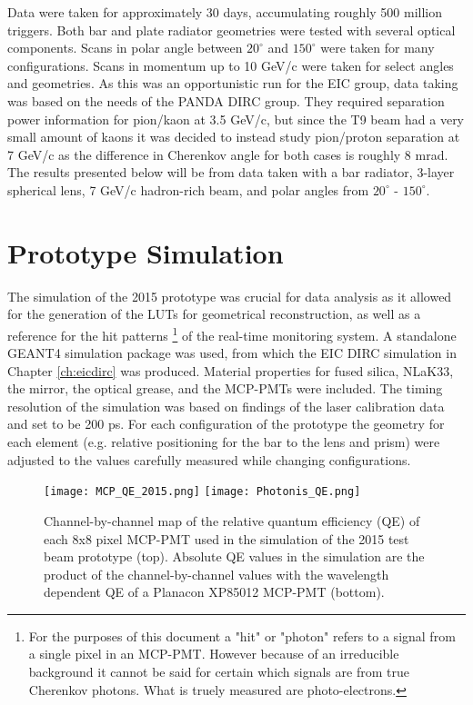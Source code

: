 Data were taken for approximately 30 days, accumulating roughly 500 million triggers. Both bar and plate radiator geometries were tested with several optical components. Scans in polar angle between $20^\circ$ and $150^\circ$ were taken for many configurations. Scans in momentum up to 10 GeV/c were taken for select angles and geometries. As this was an opportunistic run for the EIC group, data taking was based on the needs of the PANDA DIRC group. They required separation power information for pion/kaon at 3.5 GeV/c, but since the T9 beam had a very small amount of kaons it was decided to instead study pion/proton separation at 7 GeV/c as the difference in Cherenkov angle for both cases is roughly 8 mrad. The results presented below will be from data taken with a bar radiator, 3-layer spherical lens, 7 GeV/c hadron-rich beam, and polar angles from  $20^\circ$ - $150^\circ$.

\section{Prototype Simulation}
The simulation of the 2015 prototype was crucial for data analysis as it allowed for the generation of the LUTs for geometrical reconstruction, as well as a reference for the hit patterns \footnote{For the purposes of this document a "hit" or "photon" refers to a signal from a single pixel in an MCP-PMT. However because of an irreducible background it cannot be said for certain which signals are from true Cherenkov photons. What is truely measured are photo-electrons.} of the real-time monitoring system. A standalone GEANT4 simulation package was used, from which the EIC DIRC simulation in Chapter \ref{ch:eicdirc} was produced. Material properties for fused silica, NLaK33, the mirror, the optical grease, and the MCP-PMTs were included. The timing resolution of the simulation was based on findings of the laser calibration data and set to be 200 ps. For each configuration of the prototype the geometry for each element (e.g. relative positioning for the bar to the lens and prism) were adjusted to the values carefully measured while changing configurations.

\begin{figure}[!htb]
	\centering
	\texttt{[image: MCP\_QE\_2015.png]}
	\texttt{[image: Photonis\_QE.png]}
	\caption{Channel-by-channel map of the relative quantum efficiency (QE) of each 8x8 pixel MCP-PMT used in the simulation of the 2015 test beam prototype (top). Absolute QE values in the simulation are the product of the channel-by-channel values with the wavelength dependent QE of a Planacon XP85012 MCP-PMT (bottom).}
	\label{fig:quantum_efficiency}
\end{figure}

